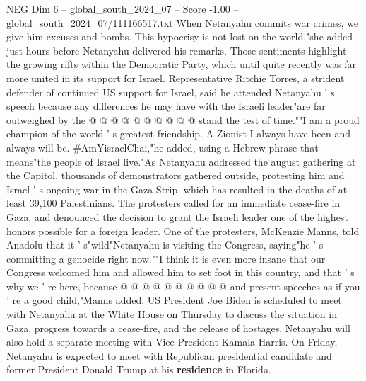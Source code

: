 \begin{textsample}{NEG Dim 6 – global\_south\_2024\_07 – Score -1.00 – global\_south\_2024\_07/111166517.txt}
When Netanyahu commits war crimes, we give him excuses and bombs.
This hypocrisy is not lost on the world,"she added just hours before Netanyahu delivered his remarks.
Those sentiments highlight the growing rifts within the Democratic Party, which until quite recently was far more united in its support for Israel.
Representative Ritchie Torres, a strident defender of continued US support for Israel, said he attended Netanyahu ' s speech because any differences he may have with the Israeli leader"are far outweighed by the @ @ @ @ @ @ @ @ @ @ stand the test of time.""I am a proud champion of the world ' s greatest friendship.
A Zionist I always have been and always will be. \#AmYisraelChai,"he added, using a Hebrew phrase that means"the people of Israel live."As Netanyahu addressed the august gathering at the Capitol, thousands of demonstrators gathered outside, protesting him and Israel ' s ongoing war in the Gaza Strip, which has resulted in the deaths of at least 39,100 Palestinians.
The protesters called for an immediate cease-fire in Gaza, and denounced the decision to grant the Israeli leader one of the highest honors possible for a foreign leader.
One of the protesters, McKenzie Manns, told Anadolu that it ' s"wild"Netanyahu is visiting the Congress, saying"he ' s committing a genocide right now.""I think it is even more insane that our Congress welcomed him and allowed him to set foot in this country, and that ' s why we ' re here, because @ @ @ @ @ @ @ @ @ @ and present speeches as if you ' re a good child,"Manns added.
US President Joe Biden is scheduled to meet with Netanyahu at the White House on Thursday to discuss the situation in Gaza, progress towards a cease-fire, and the release of hostages.
Netanyahu will also hold a separate meeting with Vice President Kamala Harris.
On Friday, Netanyahu is expected to meet with Republican presidential candidate and former President Donald Trump at his \textbf{residence} in Florida.

\end{textsample}
